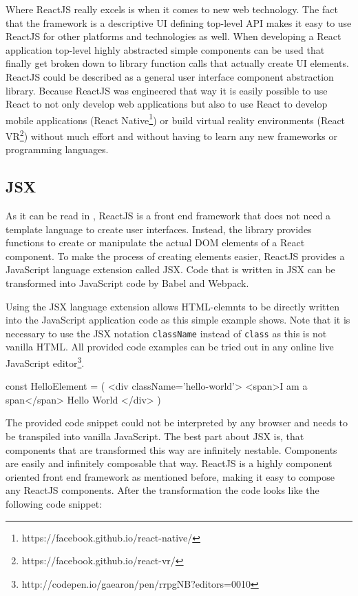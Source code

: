 Where ReactJS really excels is when it comes to new web technology. The fact that the framework is a descriptive UI defining top-level API makes it easy to use ReactJS for other platforms and technologies as well. When developing a React application top-level highly abstracted simple components can be used that finally get broken down to library function calls that actually create UI elements. ReactJS could be described as a general user interface component abstraction library. Because ReactJS was engineered that way it is easily possible to use React to not only develop web applications but also to use React to develop mobile applications (React Native\footnote{https://facebook.github.io/react-native/}) or build virtual reality environments (React VR\footnote{https://facebook.github.io/react-vr/}) without much effort and without having to learn any new frameworks or programming languages. 

\subsection{JSX} \label{ssec:jsx}

As it can be read in \cite[S.59]{Zeigermann.2016}, \mbox{ReactJS} is a front end framework that does not need a template language to create user interfaces. Instead, the library provides functions to create or manipulate the actual DOM elements of a React component. To make the process of creating elements easier, ReactJS provides a JavaScript language extension called JSX. Code that is written in JSX can be transformed into JavaScript code by \mbox{Babel} and \mbox{Webpack}. 

Using the JSX language extension allows HTML-elemnts to be directly written into the JavaScript application code as this simple example shows. Note that it is necessary to use the JSX notation \texttt{className} instead of \texttt{class} as this is not vanilla HTML. All provided code examples can be tried out in any online live JavaScript editor\footnote{http://codepen.io/gaearon/pen/rrpgNB?editors=0010}. \newline

\begin{JsCode}
const HelloElement = (
  <div className='hello-world'>
    <span>I am a span</span>
    Hello World
  </div>
)
\end{JsCode}

The provided code snippet could not be interpreted by any browser and needs to be transpiled into vanilla JavaScript. The best part about JSX is, that components that are transformed this way are infinitely nestable. Components are easily and infinitely composable that way. ReactJS is a highly component oriented front end framework as mentioned before, making it easy to compose any ReactJS components. After the transformation the code looks like the following code snippet: \newline

